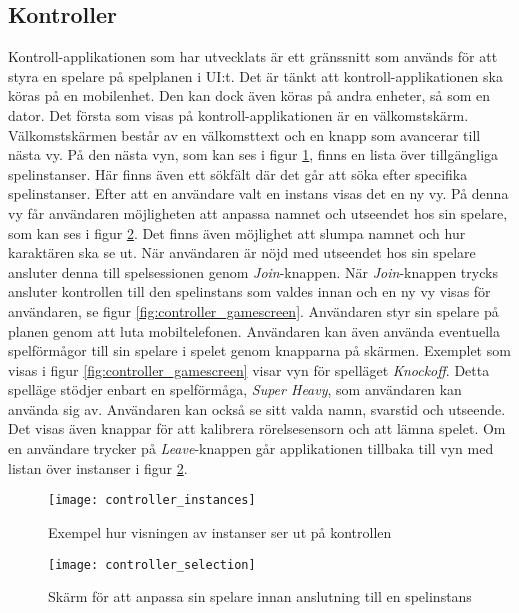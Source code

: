 \subsection{Kontroller}
Kontroll-applikationen som har utvecklats är ett gränssnitt som används för att styra en spelare på spelplanen i UI:t. Det är tänkt att kontroll-applikationen ska köras på en mobilenhet. Den kan dock även köras på andra enheter, så som en dator. Det första som visas på kontroll-applikationen är en välkomstskärm. Välkomstskärmen består av en välkomsttext och en knapp som avancerar till nästa vy. På den nästa vyn, som kan ses i figur \ref{fig:controller_instances}, finns en lista över tillgängliga spelinstanser. Här finns även ett sökfält där det går att söka efter specifika spelinstanser. Efter att en användare valt en instans visas det en ny vy. På denna vy får användaren möjligheten att anpassa namnet och utseendet hos sin spelare, som kan ses i figur \ref{fig:controller_selection}. Det finns även möjlighet att slumpa namnet och hur karaktären ska se ut. När användaren är nöjd med utseendet hos sin spelare ansluter denna till spelsessionen genom \textit{Join}-knappen. När \textit{Join}-knappen trycks ansluter kontrollen till den spelinstans som valdes innan och en ny vy visas för användaren, se figur \ref{fig:controller_gamescreen}. Användaren styr sin spelare på planen genom att luta mobiltelefonen. Användaren kan även använda eventuella spelförmågor till sin spelare i spelet genom knapparna på skärmen. Exemplet som visas i figur \ref{fig:controller_gamescreen} visar vyn för spelläget \textit{Knockoff}. Detta spelläge stödjer enbart en spelförmåga, \textit{Super Heavy}, som användaren kan använda sig av. Användaren kan också se sitt valda namn, svarstid och utseende. Det visas även knappar för att kalibrera rörelsesensorn och att lämna spelet. Om en användare trycker på \textit{Leave}-knappen går applikationen tillbaka till vyn med listan över instanser i figur \ref{fig:controller_selection}.

\begin{figure}[h]
    \centering
    \texttt{[image: controller\_instances]}
    \caption{Exempel hur visningen av instanser ser ut på kontrollen}
    \label{fig:controller_instances}
\end{figure}

\begin{figure}[H]
    \centering
    \texttt{[image: controller\_selection]}
    \caption{Skärm för att anpassa sin spelare innan anslutning till en spelinstans}
    \label{fig:controller_selection}
\end{figure}

